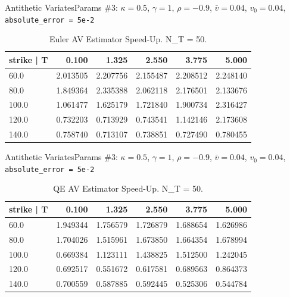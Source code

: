     \begin{frame}{Antithetic Variates}{Params \#3: $\kappa = 0.5$, $\gamma = 1$, $\rho = -0.9$, $\bar v = 0.04$, $v_0 = 0.04$, \texttt{absolute\_error = 5e-2}}
        \begin{table}
            \begin{tabular}{lrrrrr}
                \toprule
                strike | T &     0.100 &     1.325 &     2.550 &     3.775 &     5.000 \\
                \midrule
                60.0   &  2.013505 &  2.207756 &  2.155487 &  2.208512 &  2.248140 \\
                80.0   &  1.849364 &  2.335388 &  2.062118 &  2.176501 &  2.133676 \\
                100.0  &  1.061477 &  1.625179 &  1.721840 &  1.900734 &  2.316427 \\
                120.0  &  0.732203 &  0.713929 &  0.743541 &  1.142146 &  2.173608 \\
                140.0  &  0.758740 &  0.713107 &  0.738851 &  0.727490 &  0.780455 \\
                \bottomrule
            \end{tabular}   
            \caption{Euler AV Estimator Speed-Up. N\_T = 50.}
        \end{table}         
    \end{frame}

    \begin{frame}{Antithetic Variates}{Params \#3: $\kappa = 0.5$, $\gamma = 1$, $\rho = -0.9$, $\bar v = 0.04$, $v_0 = 0.04$, \texttt{absolute\_error = 5e-2}}
        \begin{table}
            \begin{tabular}{lrrrrr}
                \toprule
                strike | T &     0.100 &     1.325 &     2.550 &     3.775 &     5.000 \\
                \midrule
                60.0   &  1.949344 &  1.756579 &  1.726879 &  1.688654 &  1.626986 \\
                80.0   &  1.704026 &  1.515961 &  1.673850 &  1.664354 &  1.678994 \\
                100.0  &  0.669384 &  1.123111 &  1.438825 &  1.512500 &  1.242045 \\
                120.0  &  0.692517 &  0.551672 &  0.617581 &  0.689563 &  0.864373 \\
                140.0  &  0.700559 &  0.587885 &  0.592445 &  0.525306 &  0.544784 \\
                \bottomrule
                \end{tabular}
            \caption{QE AV Estimator Speed-Up. N\_T = 50.}
        \end{table}         
    \end{frame}

